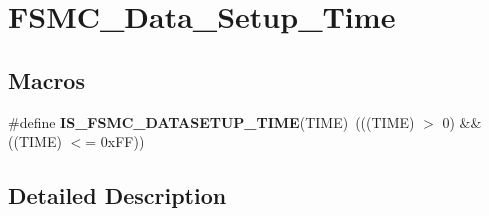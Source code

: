 \hypertarget{group___f_s_m_c___data___setup___time}{\section{F\-S\-M\-C\-\_\-\-Data\-\_\-\-Setup\-\_\-\-Time}
\label{group___f_s_m_c___data___setup___time}
}
\subsection*{Macros}
\begin{DoxyCompactItemize}
\item 
\hypertarget{group___f_s_m_c___data___setup___time_ga3d923de775489e844913b29e77e8cca7}{\#define {\bfseries I\-S\-\_\-\-F\-S\-M\-C\-\_\-\-D\-A\-T\-A\-S\-E\-T\-U\-P\-\_\-\-T\-I\-M\-E}(T\-I\-M\-E)~(((T\-I\-M\-E) $>$ 0) \&\& ((T\-I\-M\-E) $<$= 0x\-F\-F))}\label{group___f_s_m_c___data___setup___time_ga3d923de775489e844913b29e77e8cca7}

\end{DoxyCompactItemize}


\subsection{Detailed Description}

